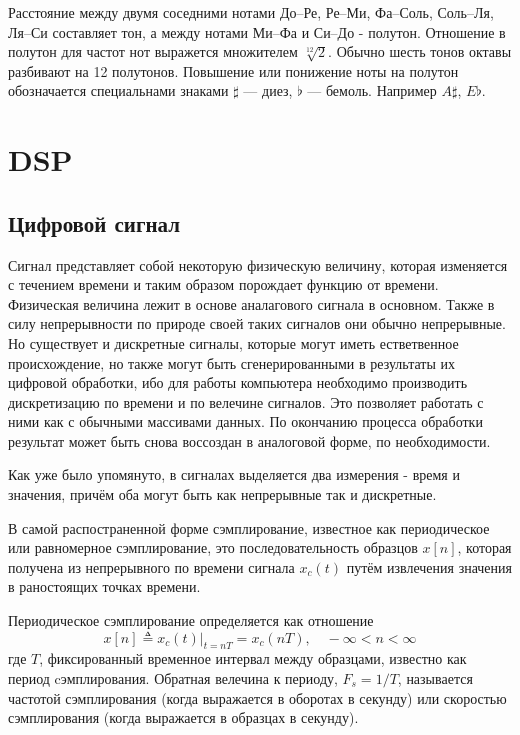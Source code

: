 \documentclass[oneside, final, 14pt]{extarticle}
\begin{document}
  Расстояние между двумя соседними нотами До--Ре, Ре--Ми, Фа--Соль, Соль--Ля,
  Ля--Си составляет тон, а между нотами Ми--Фа и Си--До - полутон. Отношение
  в полутон для частот нот выражется множителем $\sqrt[12]{2}$. Обычно
  шесть тонов октавы разбивают на 12 полутонов. Повышение или понижение
  ноты на полутон обозначается специальнами знаками $\sharp$ --- диез,
  $\flat$ --- бемоль. Например $A\sharp$, $E\flat$.

\cleardoublepage

\section{DSP}

\subsection{Цифровой сигнал}
  Сигнал представляет собой некоторую физическую величину, которая
  изменяется с течением времени и таким образом порождает функцию
  от времени. Физическая величина лежит в основе аналагового сигнала
  в основном. Также в силу непрерывности по природе своей таких сигналов
  они обычно непрерывные. Но существует и дискретные сигналы, которые
  могут иметь естветвенное происхождение, но также могут быть
  сгенерированными в результаты их цифровой обработки, ибо
  для работы компьютера необходимо производить дискретизацию по времени
  и по велечине сигналов. Это позволяет работать с ними как с обычными
  массивами данных. По окончанию процесса обработки результат может
  быть снова воссоздан в аналоговой форме, по необходимости.

  Как уже было упомянуто, в сигналах выделяется два измерения - время и
  значения, причём оба могут быть как непрерывные так и дискретные.

  В самой распостраненной форме сэмплирование, известное как периодическое
  или равномерное сэмплирование, это последовательность образцов
  $x[n]$, которая получена из непрерывного по времени сигнала
  $x_c(t)$ путём извлечения значения в раностоящих точках времени.

  Периодическое сэмплирование определяется как отношение
  \[
    x[n] \triangleq x_c(t) \left. \right|_{t=nT} = x_c(nT), \quad
    - \infty < n < \infty
  \]
  где $T$, фиксированный временное интервал между образцами, известно
  как период cэмплирования. Обратная велечина к периоду, $F_s = 1 / T$,
  называется частотой сэмплирования (когда выражается в оборотах в секунду)
  или скоростью сэмплирования (когда выражается в образцах в секунду).
\end{document}
